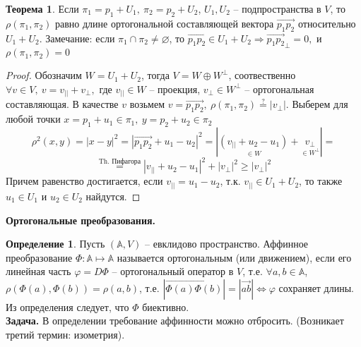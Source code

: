 \documentclass[a4paper, 12pt]{article}
\theoremstyle{definition}
\newtheorem*{definition}{Определение}
\newtheorem*{theorem}{Теорема}
\begin{document}
    \begin{theorem}
        Если $\pi_1 = p_1 + U_1,\ \pi_2 = p_2 + U_2$, 
        $U_1,U_2$ -- подпространства в $V$, то $\rho(\pi_1,
        \pi_2)$ равно длине ортогональной составляющей вектора 
        $\overrightarrow{p_1p_2}$ относительно $U_1 + U_2$.
        Замечание: если $\pi_1 \cap \pi_2 \neq \varnothing$,
        то $\overrightarrow{p_1p_2} \in U_1 + U_2 
        \Longrightarrow \overrightarrow{p_1p_2}_\perp = 0,$ 
        и $\rho(\pi_1, \pi_2) = 0$ 
    \end{theorem}
    \begin{proof}
        Обозначим $W = U_1 + U_2$, тогда $V = W \oplus 
        W^\perp$, соотвественно $\forall v \in V,\ v = v_{||}  
        + v_\perp,$ где $v_{||} \in W$ -- проекция, 
        $v_\perp \in W^\perp$ -- ортогональная составляющая.
        В качестве $v$ возьмем $v = \overrightarrow{p_1p_2},
        \ \rho(\pi_1,\pi_2) \overset{?}{=} |v_\perp|$. 
        Выберем для любой точки $x = p_1 + u_1 \in \pi_1,\ 
        y = p_2 + u_2 \in \pi_2$
        $$\rho^2(x,y) = |x - y|^2 = |\overrightarrow{p_1p_2} +
        u_1 - u_2|^2 = |\underset{\in W}{(v_{||} + u_2 - u_1)}+ 
        \underset{\in W^\perp}{v_\perp}| = $$
        $$\overset{\text{Th. Пифагора}}{=} |v_{||} + u_2 - u_1|
        ^2 + |v_\perp|^2 \geq |v_\perp|
        ^2$$
        Причем равенство достигается, если $v_{||} = u_1 - 
        u_2$, т.к. $v_{||} \in U_1 + U_2$, то также $u_1 \in 
        U_1$ и $u_2 \in U_2$ найдутся. 

    \end{proof}
    \begin{center}
        \textbf{Ортогональные преобразования.} 
    \end{center}
    \begin{definition}
        Пусть $(\mathbb{A}, V)$ -- евклидово пространство. 
        Аффинное преобразование $\Phi:\mathbb{A} \longmapsto 
        \mathbb{A}$ называется ортогональным (или движением),
        если его линейная часть $\varphi = D \Phi$ -- 
        ортогональный оператор в $V$, т.е. $\forall a,b \in 
        \mathbb{A}$, $\rho(\Phi(a), \Phi(b)) = \rho(a, b)$,
        т.е. $|\overrightarrow{\Phi(a)\Phi(b)}| = |
        \overrightarrow{ab}| \Longleftrightarrow \varphi$ 
        сохраняет длины.\\
        Из определения следует, что $\Phi$ биективно.\\
        \textbf{Задача.} В определении требование аффинности 
        можно отбросить. (Возникает третий термин: изометрия). 

    \end{definition}
\end{document}
